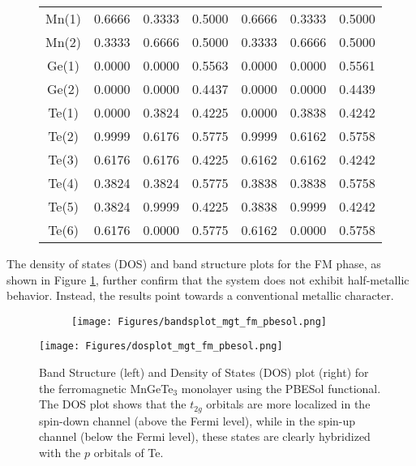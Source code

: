 \begin{figure}[H]
\begin{minipage}[b]{.55\linewidth}
{\begin{tabular}{ccccccc}
				Mn(1) & 0.6666 & 0.3333 & 0.5000 & 0.6666 & 0.3333 & 0.5000 \\
				Mn(2) & 0.3333 & 0.6666 & 0.5000 & 0.3333 & 0.6666 & 0.5000 \\
				Ge(1) & 0.0000 & 0.0000 & 0.5563 & 0.0000 & 0.0000 & 0.5561 \\ 
				Ge(2) & 0.0000 & 0.0000 & 0.4437 & 0.0000 & 0.0000 & 0.4439 \\
				Te(1) & 0.0000 & 0.3824 & 0.4225 & 0.0000 & 0.3838 & 0.4242 \\
				Te(2) & 0.9999 & 0.6176 & 0.5775 & 0.9999 & 0.6162 & 0.5758 \\
				Te(3) & 0.6176 & 0.6176 & 0.4225 & 0.6162 & 0.6162 & 0.4242 \\
				Te(4) & 0.3824 & 0.3824 & 0.5775 & 0.3838 & 0.3838 & 0.5758 \\
				Te(5) & 0.3824 & 0.9999 & 0.4225 & 0.3838 & 0.9999 & 0.4242 \\
				Te(6) & 0.6176 & 0.0000 & 0.5775 & 0.6162 & 0.0000 & 0.5758 \\
				\bottomrule
				\bottomrule
			\end{tabular}
		}
	\end{minipage}
\end{figure}

The density of states (DOS) and band structure plots for the FM phase, as shown in Figure \ref{fig:4.12}, further confirm that the system does not exhibit half-metallic behavior. Instead, the results point towards a conventional metallic character.

\begin{figure}[H]
	\begin{subfigure}{.5\textwidth}
		\centering
		\texttt{[image: Figures/bandsplot\_mgt\_fm\_pbesol.png]}
	\end{subfigure}%
	\begin{minipage}{.5\textwidth}
		\vspace{-12.6cm}
		\centering
		\texttt{[image: Figures/dosplot\_mgt\_fm\_pbesol.png]}
		\captionsetup{justification=centering}
	\end{minipage}
	\caption{Band Structure (left) and Density of States (DOS) plot (right) for the ferromagnetic MnGeTe$_3$ monolayer using the PBESol functional. The DOS plot shows that the $t_{2g}$ orbitals are more localized in the spin-down channel (above the Fermi level), while in the spin-up channel (below the Fermi level), these states are clearly hybridized with the $p$ orbitals of Te.}
	\label{fig:4.12}
\end{figure}




